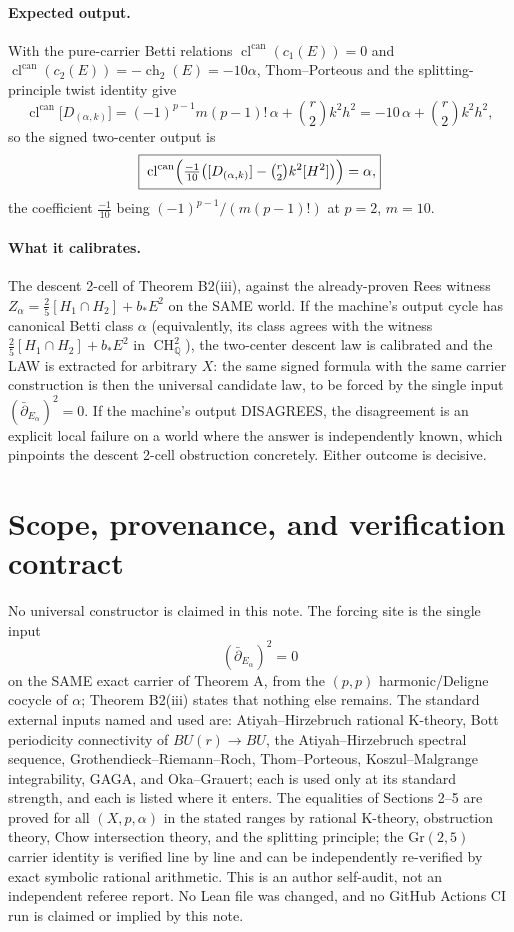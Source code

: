 \documentclass[11pt]{article}
\newcommand{\ch}{\operatorname{ch}}
\newcommand{\ddbar}{\bar\partial}
\begin{document}
\paragraph{Expected output.}
With the pure-carrier Betti relations
$\operatorname{cl}^{\operatorname{can}}(c_1(E))=0$ and
$\operatorname{cl}^{\operatorname{can}}(c_2(E))=-\ch_2(E)=-10\alpha$,
Thom--Porteous and the splitting-principle twist identity give
\[
  \operatorname{cl}^{\operatorname{can}}\bigl[D_{(\alpha,k)}\bigr]
  =(-1)^{p-1}m(p-1)!\,\alpha+\binom r2 k^2h^2
  =-10\,\alpha+\binom r2 k^2h^2,
\]
so the signed two-center output is
\[
  \boxed{\;
  \operatorname{cl}^{\operatorname{can}}\Bigl(
    \tfrac{-1}{10}\bigl([D_{(\alpha,k)}]-\tbinom r2k^2[H^2]\bigr)
  \Bigr)=\alpha ,}
\]
the coefficient $\tfrac{-1}{10}$ being
$(-1)^{p-1}/(m(p-1)!)$ at $p=2$, $m=10$.

\paragraph{What it calibrates.}
The descent 2-cell of Theorem B2(iii), against the already-proven Rees
witness $Z_\alpha=\frac25[H_1\cap H_2]+b_*E^2$ on the SAME world. If
the machine's output cycle has canonical Betti class $\alpha$
(equivalently, its class agrees with the witness
$\frac25[H_1\cap H_2]+b_*E^2$ in $\operatorname{CH}^2_{\mathbb Q}$),
the two-center descent law is calibrated and the LAW is extracted for
arbitrary $X$: the same signed formula with the same carrier
construction is then the universal candidate law, to be forced by the
single input $(\ddbar_{E_\alpha})^2=0$. If the machine's output
DISAGREES, the disagreement is an explicit local failure on a world
where the answer is independently known, which pinpoints the descent
2-cell obstruction concretely. Either outcome is decisive.

\section{Scope, provenance, and verification contract}
No universal constructor is claimed in this note. The forcing site is
the single input
\[
  (\ddbar_{E_\alpha})^2=0
\]
on the SAME exact carrier of Theorem A, from the $(p,p)$
harmonic/Deligne cocycle of $\alpha$; Theorem B2(iii) states that
nothing else remains. The standard external inputs named and used are:
Atiyah--Hirzebruch rational K-theory, Bott periodicity connectivity of
$BU(r)\to BU$, the Atiyah--Hirzebruch spectral sequence,
Grothendieck--Riemann--Roch, Thom--Porteous,
Koszul--Malgrange integrability, GAGA, and Oka--Grauert; each is used
only at its standard strength, and each is listed where it enters.
The equalities of Sections 2--5 are proved for all
$(X,p,\alpha)$ in the stated ranges by rational K-theory, obstruction
theory, Chow intersection theory, and the splitting principle; the
$\mathrm{Gr}(2,5)$ carrier identity is verified line by line and can be
independently re-verified by exact symbolic rational arithmetic.
This is an author self-audit, not an independent referee report.
No Lean file was changed, and no GitHub Actions CI run is claimed or
implied by this note.
\end{document}
